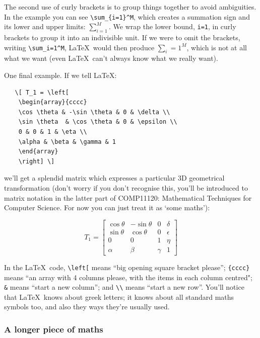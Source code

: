 The second use of curly brackets is to group things together to avoid ambiguities. In the example you can see \verb|\sum_{i=1}^M|, which creates a summation sign and its lower and upper limits: \( \sum_{i=1}^{M} \). We wrap the lower bound, \verb|i=1|, in curly brackets to group it into an indivisible unit. If we were to omit the brackets, writing \verb|\sum_i=1^M|, \LaTeX\ would then produce \( \sum_i=1^M \), which is not at all what we want (even \LaTeX\ can't always know what we really want).

One final example. If we tell \LaTeX:

\begin{verbatim}
   \[ T_1 = \left[
    \begin{array}{cccc}
    \cos \theta & -\sin \theta & 0 & \delta \\
    \sin \theta  & \cos \theta & 0 & \epsilon \\
    0 & 0 & 1 & \eta \\
    \alpha & \beta & \gamma & 1
    \end{array}
    \right] \]
\end{verbatim}
%
we'll get a splendid matrix which expresses a particular 3D geometrical transformation (don't worry if you don't recognise this, you'll be introduced to matrix notation in the latter part of COMP11120: Mathematical Techniques for Computer Science. For now you can just treat it as `some maths'):

\[   T_1 = \left[
    \begin{array}{cccc}
    \cos \theta & -\sin \theta & 0 & \delta \\
    \sin \theta  & \cos \theta & 0 & \epsilon \\
    0 & 0 & 1 & \eta \\
    \alpha & \beta & \gamma & 1
    \end{array}
    \right]
\]
%

In the \LaTeX\ code,  \verb|\left[| means ``big opening square bracket please'';  \verb|{cccc}| means ``an array with 4 columns please, with the items in each column centred"; \verb|&| means ``start a new column''; and \verb|\\| means ``start a new row''. You'll notice that \LaTeX\ knows about  greek letters; it knows about all standard maths symbols too, and also they ways  they're usually used.


\subsubsection{A longer piece of maths}
\label{sec:longer-piece-maths}

